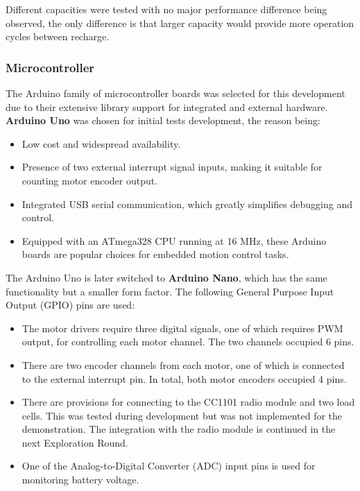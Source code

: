 Different capacities were tested with no major performance difference being observed, the only difference is that larger capacity would provide more operation cycles between recharge.

\subsubsection{Microcontroller}
\label{subsubsection:exploration-1-microcontroller}

The Arduino family of microcontroller boards was selected for this development due to their extensive library support for integrated and external hardware.
\textbf{Arduino Uno} was chosen for initial tests development, the reason being:

\begin{itemize}[nosep]
    \item Low cost and widespread availability.
    \item Presence of two external interrupt signal inputs, making it suitable for counting motor encoder output.
    \item Integrated USB serial communication, which greatly simplifies debugging and control.
    \item Equipped with an ATmega328 CPU running at 16 MHz, these Arduino boards are popular choices for embedded motion control tasks.
\end{itemize}

The Arduino Uno is later switched to \textbf{Arduino Nano}, which has the same functionality but a smaller form factor. The following General Purpose Input Output (GPIO) pins are used:

\begin{itemize}[nosep]
    \item The motor drivers require three digital signals, one of which requires PWM output, for controlling each motor channel. The two channels occupied 6 pins.
    \item There are two encoder channels from each motor, one of which is connected to the external interrupt pin. In total, both motor encoders occupied 4 pins.
    \item There are provisions for connecting to the CC1101 radio module and two load cells. This was tested during development but was not implemented for the demonstration. The integration with the radio module is continued in the next Exploration Round.
    \item One of the Analog-to-Digital Converter (ADC) input pins is used for monitoring battery voltage.
\end{itemize}

